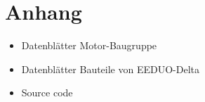 \chapter{Anhang}
\begin{itemize}
\item Datenblätter Motor-Baugruppe
\item Datenblätter Bauteile von EEDUO-Delta
\item Source code 
\end{itemize}